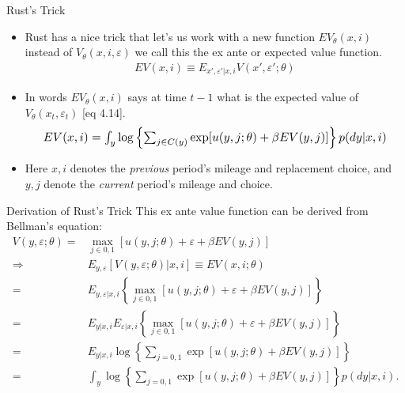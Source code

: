 \documentclass[xcolor=pdftex,dvipsnames,table,mathserif]{beamer}
\begin{document}
\begin{frame}{Rust's Trick}\

\begin{itemize}
\item Rust has a nice trick that let's us work with a new function $EV_{\theta}(x,i)$ instead of $V_{\theta}(x,i,\varepsilon)$ we call this the \alert{ex ante} or \alert{expected value function}.
\begin{eqnarray*}
EV(x, i) \equiv E_{x', \varepsilon ' | x, i} V(x', \varepsilon ' ; \theta)
\end{eqnarray*}
\item In words $EV_{\theta}(x,i)$ says at time $t-1$ what is the expected value of $V_{\theta}(x_t,\varepsilon_t)$ [eq 4.14].
\begin{eqnarray*}
\resizebox{.9\hsize}{!}{$EV(x,i) = \int_y \log \left \{ \sum_{j \in C(y)} \exp [ u(y,j; \theta) + \beta EV(y, j)] \right \} p(dy|x,i) $}
\end{eqnarray*}
\item Here $x, i$ denotes the \emph{previous} period's mileage and replacement choice, and $y, j$ denote the \emph{current} period's mileage and choice. 
\end{itemize}
\end{frame}

\begin{frame}{Derivation of Rust's Trick}
This \alert{ex ante value function} can be derived from Bellman's equation:
\begin{equation*}
\begin{split}
V(y, \varepsilon ;\theta) = & \max_{j \in 0,1} [ u(y, j ; \theta) + \varepsilon + \beta EV(y,j)] \\
\Longrightarrow & E_{y, \varepsilon} [V(y, \varepsilon ; \theta) | x, i ] \equiv  EV(x, i ; \theta) \\
= & E_{y, \varepsilon | x, i } \left \{ \max_{ j \in 0,1} [ u(y, j ; \theta) + \varepsilon + \beta EV(y,j)] \right \} \\
= &  E_{y | x, i }  E_{\varepsilon | x, i } \left \{ \max_{ j \in 0,1} [ u(y, j ; \theta) + \varepsilon + \beta EV(y,j)] \right \} \\
= &  E_{y | x, i } \log \left \{ \sum_{j=0,1} \exp [ u(y, j ; \theta)  + \beta EV(y,j)] \right \} \\
= & \int_y \log  \left \{ \sum_{j=0,1} \exp [ u(y, j ; \theta)  + \beta EV(y,j)] \right \} p(dy|x,i).
\end{split}
\end{equation*}
\end{frame}
%
\end{document}
